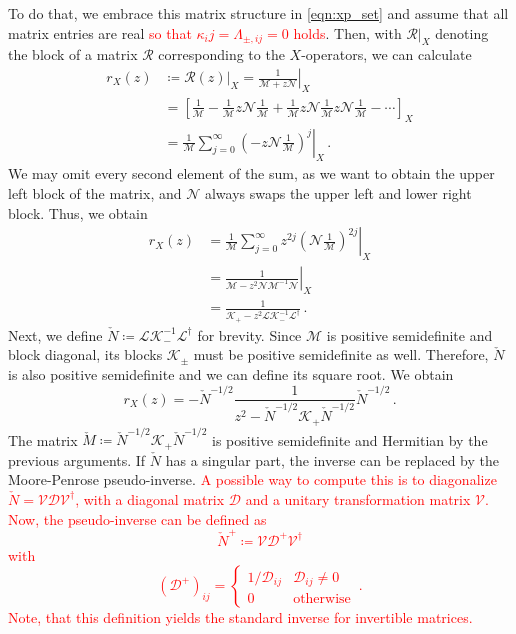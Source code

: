 \documentclass[
    reprint, 
    aps,
    preprintnumbers,
    twocolumn,
    prb,
    superscriptaddress
]{revtex4-2}
\newcommand{\mM}{\mathcal{M}}
\newcommand{\mN}{\mathcal{N}}
\begin{document}
To do that, we embrace this matrix structure in \eqref{eqn:xp_set} and assume that all matrix entries are real \textcolor{red}{so that $\kappa_ij = \Lambda_{\pm,ij} = 0$ holds}.
Then, with $\mathcal{R}|_X$ denoting the block of a matrix $\mathcal{R}$ corresponding to the $X$-operators, we can calculate
\begin{align}
    r_X (z) &\coloneqq \mathcal{R}(z)|_X = \left. \frac{1}{\mM + z \mN} \right\vert_X \nonumber \\
        &= \left[ \frac{1}{\mM} - \frac{1}{\mM} z \mN \frac{1}{\mM} + \frac{1}{\mM} z \mN \frac{1}{\mM} z \mN \frac{1}{\mM} - \cdots \right]_X \nonumber \\
        &= \left. \frac{1}{\mM} \sum_{j=0}^\infty \left( -z \mN \frac{1}{\mM} \right)^j \right\vert_X \,.
\end{align}
We may omit every second element of the sum, as we want to obtain the upper left block of the matrix, and $\mN$ always swaps the upper left and lower right block.
Thus, we obtain
\begin{align}
    r_X (z) &= \left. \frac{1}{\mM} \sum_{j=0}^\infty z^{2j} \left( \mN \frac{1}{\mM} \right)^{2j} \right\vert_X \nonumber \\
        &= \left. \frac{1}{\mM - z^2 \mN \mM^{-1} \mN} \right\vert_X \nonumber \\
        &= \frac{1}{\mathcal{K}_+ - z^2 \mathcal{L} \mathcal{K}_-^{-1} \mathcal{L}^\dagger}\,.
\end{align}
Next, we define $\check{N} \coloneqq \mathcal{L} \mathcal{K}_-^{-1} \mathcal{L}^\dagger$ for brevity.
Since $\mathcal{M}$ is positive semidefinite and block diagonal, its blocks $\mathcal{K}_\pm$ must be positive semidefinite as well.
Therefore, $\check{N}$ is also positive semidefinite and we can define its square root.
We obtain
\begin{equation}
    \label{eqn:rx}
    r_X (z) = -\check{N}^{-1/2} \frac{1}{z^2 - \check{N}^{-1/2} \mathcal{K}_+ \check{N}^{-1/2}} \check{N}^{-1/2}\,.
\end{equation}
The matrix $\check{M} \coloneqq \check{N}^{-1/2} \mathcal{K}_+ \check{N}^{-1/2}$ is positive semidefinite and Hermitian by the previous arguments.
If $\check{N}$ has a singular part, the inverse can be replaced by the Moore-Penrose pseudo-inverse.
\textcolor{red}{A possible way to compute this is to diagonalize $\check{N} = \mathcal{V} \mathcal{D} \mathcal{V}^\dagger$, with a diagonal matrix $\mathcal{D}$ and a unitary transformation matrix $\mathcal{V}$.
Now, the pseudo-inverse can be defined as
\begin{equation}
    \check{N}^+ \coloneqq \mathcal{V} \mathcal{D}^+ \mathcal{V}^\dagger
\end{equation}
with
\begin{equation}
    (\mathcal{D}^+)_{ij} = \begin{cases}
        1/\mathcal{D}_{ij} & \mathcal{D}_{ij} \neq 0 \\ 0 & \text{otherwise}
    \end{cases}\,.
\end{equation}
Note, that this definition yields the standard inverse for invertible matrices.}
\end{document}

